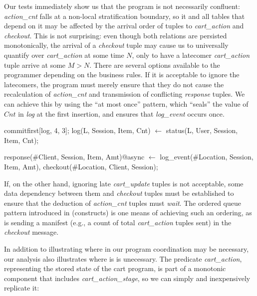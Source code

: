 

Our tests immediately show us that the program is not necessarily confluent: 
{\em action\_cnt} falls at a non-local stratification boundary, so it and all tables that
depend on it may be affected by the arrival order of tuples to {\em cart\_action} and
{\em checkout}.  This is not surprising: even though both relations are persisted monotonically,
the arrival of a {\em checkout} tuple may cause us to universally quantify over {\em cart\_action}
at some time $N$, only to have a latecomer {\em cart\_action} tuple arrive at some $M > N$.
There are several options available to the programmer depending on the business rules.
If it is acceptable to ignore the latecomers, the program must merely ensure that they do not 
cause the recalculation of {\em action\_cnt} and transmission of conflicting {\em response} 
tuples.  We can achieve this by using the ``at most once'' pattern, which ``seals'' the value
of $Cnt$ in {\em log} at the first insertion, and ensures that {\em log\_event} occurs once.
\begin{Dedalus}
commitfirst[log, 4, 3];
log(L, Session, Item, Cnt) \(\leftarrow\) 
    status(L, User, Session, Item, Cnt);

response(#Client, Session, Item, Amt)@async \(\leftarrow\)
    log_event(#Location, Session, Item, Amt),
    checkout(#Location, Client, Session);
\end{Dedalus}


If, on the other hand, ignoring late {\em  cart\_update} tuples is not acceptable,
some data dependency between them and {\em checkout} tuples must be established
to ensure that the deduction of {\em action\_cnt} tuples must {\em wait}.  
The ordered queue pattern introduced in (constructs) is one means of achieving such an 
ordering, as is sending a manifest (e.g., a count of total {\em cart\_action} tuples
sent) in the {\em checkout} message.




In addition to illustrating where in our program coordination may be necessary, our
analysis also illustrates where is is unecessary.
The predicate {\em cart\_action}, representing the stored state 
of the cart program,  is part of a monotonic component that includes {\em cart\_action\_stage}, 
so we can simply and inexpensively replicate it:

